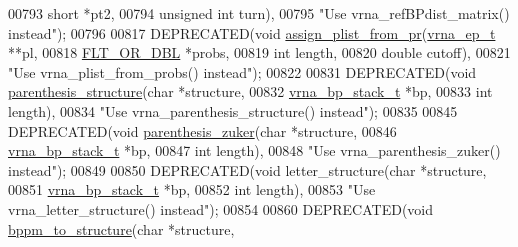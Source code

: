 \begin{DoxyCode}
00793                                                \textcolor{keywordtype}{short}        *pt2,
00794                                                \textcolor{keywordtype}{unsigned} \textcolor{keywordtype}{int} turn),
00795            \textcolor{stringliteral}{"Use vrna\_refBPdist\_matrix() instead"});
00796 
00817 DEPRECATED(\textcolor{keywordtype}{void}  \hyperlink{group__part__func__global__deprecated_ga1cc05aaa9b0e7df2d3887e98321c2030}{assign\_plist\_from\_pr}(\hyperlink{group__struct__utils__plist_structvrna__elem__prob__s}{vrna\_ep\_t}   **pl,
00818                                       \hyperlink{group__data__structures_ga31125aeace516926bf7f251f759b6126}{FLT\_OR\_DBL}  *probs,
00819                                       \textcolor{keywordtype}{int}         length,
00820                                       \textcolor{keywordtype}{double}      cutoff),
00821            \textcolor{stringliteral}{"Use vrna\_plist\_from\_probs() instead"});
00822 
00831 DEPRECATED(\textcolor{keywordtype}{void} \hyperlink{group__struct__utils__deprecated_gadf0ad2d46c9ca7b850437d1b79627a7e}{parenthesis\_structure}(\textcolor{keywordtype}{char}            *structure,
00832                                       \hyperlink{group__data__structures_structvrna__bp__stack__s}{vrna\_bp\_stack\_t} *bp,
00833                                       \textcolor{keywordtype}{int}             length),
00834            \textcolor{stringliteral}{"Use vrna\_parenthesis\_structure() instead"});
00835 
00845 DEPRECATED(\textcolor{keywordtype}{void} \hyperlink{group__struct__utils__deprecated_gab9c5c8311bd5120900585d4fa50c2df0}{parenthesis\_zuker}(\textcolor{keywordtype}{char}            *structure,
00846                                   \hyperlink{group__data__structures_structvrna__bp__stack__s}{vrna\_bp\_stack\_t} *bp,
00847                                   \textcolor{keywordtype}{int}             length),
00848            \textcolor{stringliteral}{"Use vrna\_parenthesis\_zuker() instead"});
00849 
00850 DEPRECATED(\textcolor{keywordtype}{void} letter\_structure(\textcolor{keywordtype}{char}             *structure,
00851                                  \hyperlink{group__data__structures_structvrna__bp__stack__s}{vrna\_bp\_stack\_t}  *bp,
00852                                  \textcolor{keywordtype}{int}              length),
00853            \textcolor{stringliteral}{"Use vrna\_letter\_structure() instead"});
00854 
00860 DEPRECATED(\textcolor{keywordtype}{void}  \hyperlink{group__struct__utils__deprecated_ga129d81c4a1ead793c5b2311333e03dfa}{bppm\_to\_structure}(\textcolor{keywordtype}{char}         *structure,

\end{DoxyCode}
